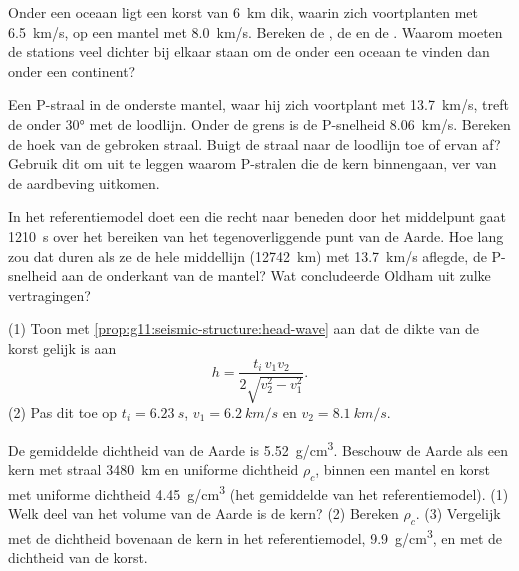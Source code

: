 \begin{exercise}[$\star\star$]\label{exo:g11:seismic-structure:9}
Onder een oceaan ligt een korst van \qty{6}{km} dik, waarin  zich
voortplanten met \qty{6.5}{km/s}, op een mantel met \qty{8.0}{km/s}. Bereken de
, de  en de . Waarom moeten de stations
veel dichter bij elkaar staan om de  onder een oceaan te vinden dan onder een
continent?
\end{exercise}

\begin{exercise}[$\star\star$]\label{exo:g11:seismic-structure:10}
Een P-straal in de onderste mantel, waar hij zich voortplant met \qty{13.7}{km/s},
treft de  onder \ang{30} met de loodlijn. Onder de grens is de
P-snelheid \qty{8.06}{km/s}. Bereken de hoek van de gebroken straal. Buigt de
straal naar de loodlijn toe of ervan af? Gebruik dit om uit te leggen waarom
P-stralen die de kern binnengaan, ver van de aardbeving uitkomen.
\end{exercise}

\begin{exercise}[$\star\star$]\label{exo:g11:seismic-structure:11}
In het referentiemodel doet een  die recht naar beneden door het middelpunt
gaat \qty{1210}{s} over het bereiken van het tegenoverliggende punt van de Aarde.
Hoe lang zou dat duren als ze de hele middellijn (\qty{12742}{km}) met
\qty{13.7}{km/s} aflegde, de P-snelheid aan de onderkant van de mantel? Wat
concludeerde Oldham uit zulke vertragingen?
\end{exercise}

\begin{exercise}[$\star\star\star$]\label{exo:g11:seismic-structure:12}
(1) Toon met \cref{prop:g11:seismic-structure:head-wave} aan dat de dikte
van de korst gelijk is aan
\[
  h = \frac{t_i\,v_1 v_2}{2\sqrt{v_2^2 - v_1^2}}.
\]
(2) Pas dit toe op $t_i = \qty{6.23}{s}$, $v_1 = \qty{6.2}{km/s}$ en
$v_2 = \qty{8.1}{km/s}$.
\end{exercise}

\begin{exercise}[$\star\star\star$]\label{exo:g11:seismic-structure:13}
De gemiddelde dichtheid van de Aarde is \qty{5.52}{g/cm^3}. Beschouw de Aarde als
een kern met straal \qty{3480}{km} en uniforme dichtheid $\rho_c$, binnen een
mantel en korst met uniforme dichtheid \qty{4.45}{g/cm^3} (het gemiddelde van het
referentiemodel). (1) Welk deel van het volume van de Aarde is de kern? (2) Bereken
$\rho_c$. (3) Vergelijk met de dichtheid bovenaan de kern in het
referentiemodel, \qty{9.9}{g/cm^3}, en met de dichtheid van de korst.
\end{exercise}

